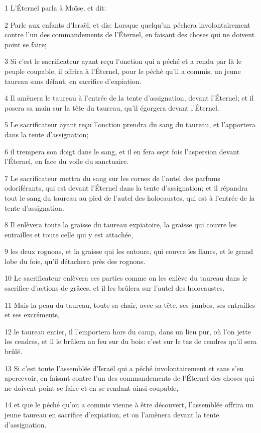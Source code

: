 \par 1 L'Éternel parla à Moïse, et dit:
\par 2 Parle aux enfants d'Israël, et dis: Lorsque quelqu'un péchera involontairement contre l'un des commandements de l'Éternel, en faisant des choses qui ne doivent point se faire;
\par 3 Si c'est le sacrificateur ayant reçu l'onction qui a péché et a rendu par là le peuple coupable, il offrira à l'Éternel, pour le péché qu'il a commis, un jeune taureau sans défaut, en sacrifice d'expiation.
\par 4 Il amènera le taureau à l'entrée de la tente d'assignation, devant l'Éternel; et il posera sa main sur la tête du taureau, qu'il égorgera devant l'Éternel.
\par 5 Le sacrificateur ayant reçu l'onction prendra du sang du taureau, et l'apportera dans la tente d'assignation;
\par 6 il trempera son doigt dans le sang, et il en fera sept fois l'aspersion devant l'Éternel, en face du voile du sanctuaire.
\par 7 Le sacrificateur mettra du sang sur les cornes de l'autel des parfums odoriférants, qui est devant l'Éternel dans la tente d'assignation; et il répandra tout le sang du taureau au pied de l'autel des holocaustes, qui est à l'entrée de la tente d'assignation.
\par 8 Il enlèvera toute la graisse du taureau expiatoire, la graisse qui couvre les entrailles et toute celle qui y est attachée,
\par 9 les deux rognons, et la graisse qui les entoure, qui couvre les flancs, et le grand lobe du foie, qu'il détachera près des rognons.
\par 10 Le sacrificateur enlèvera ces parties comme on les enlève du taureau dans le sacrifice d'actions de grâces, et il les brûlera sur l'autel des holocaustes.
\par 11 Mais la peau du taureau, toute sa chair, avec sa tête, ses jambes, ses entrailles et ses excréments,
\par 12 le taureau entier, il l'emportera hors du camp, dans un lieu pur, où l'on jette les cendres, et il le brûlera au feu sur du bois: c'est sur le tas de cendres qu'il sera brûlé.
\par 13 Si c'est toute l'assemblée d'Israël qui a péché involontairement et sans s'en apercevoir, en faisant contre l'un des commandements de l'Éternel des choses qui ne doivent point se faire et en se rendant ainsi coupable,
\par 14 et que le péché qu'on a commis vienne à être découvert, l'assemblée offrira un jeune taureau en sacrifice d'expiation, et on l'amènera devant la tente d'assignation.
